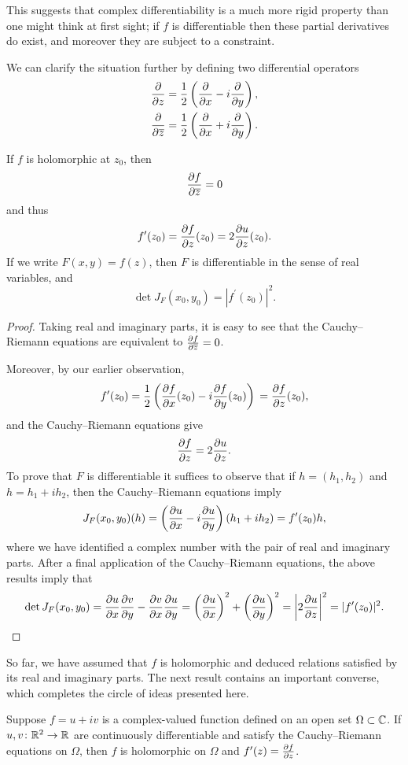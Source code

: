 \begin{remark}
This suggests that complex differentiability is a much more rigid property than one might think at first sight; if $f$ is differentiable then these partial derivatives do exist, and moreover they are subject to a constraint.
\end{remark}

We can clarify the situation further by defining two differential operators
\begin{align*}
\pdv{}{z}&=\frac{1}{2}\left(\pdv{}{x}-i\pdv{}{y}\right),\\
\pdv{}{\overline{z}}&=\frac{1}{2}\left(\pdv{}{x}+i\pdv{}{y}\right).
\end{align*}

\begin{proposition}
If $f$ is holomorphic at $z_0$, then
\[\pdv{f}{\overline{z}}=0\]
and thus
\[f^\prime(z_0)=\pdv{f}{z}(z_0)=2\pdv{u}{z}(z_0).\]
If we write $F(x,y)=f(z)$, then $F$ is differentiable in the sense of real variables, and
\[\det J_F(x_0,y_0)=|f^\prime(z_0)|^2.\]
\end{proposition}

\begin{proof}
Taking real and imaginary parts, it is easy to see that the Cauchy--Riemann equations are equivalent to $\pdv{f}{\overline{z}}=0$.

Moreover, by our earlier observation,
\[f^\prime(z_0)
=\frac{1}{2}\left(\pdv{f}{x}(z_0)-i\pdv{f}{y}(z_0)\right)\\
=\pdv{f}{z}(z_0),\]
and the Cauchy--Riemann equations give
\[\pdv{f}{z}=2\pdv{u}{z}.\]
To prove that $F$ is differentiable it suffices to observe that if $h=(h_1,h_2)$ and $h=h_1+ih_2$, then the Cauchy--Riemann equations imply
\[J_F(x_0,y_0)(h)=\left(\pdv{u}{x}-i\pdv{u}{y}\right)(h_1+ih_2)=f^\prime(z_0)h,\]
where we have identified a complex number with the pair of real and imaginary parts. 
After a final application of the Cauchy--Riemann equations, the above results imply that
\[\det J_F(x_0,y_0)
=\pdv{u}{x}\pdv{v}{y}-\pdv{v}{x}\pdv{u}{y}
=\left(\pdv{u}{x}\right)^2+\left(\pdv{u}{y}\right)^2=\left|2\pdv{u}{z}\right|^2=|f^\prime(z_0)|^2.\]
\end{proof}

So far, we have assumed that $f$ is holomorphic and deduced relations satisfied by its real and imaginary parts. The next result contains an important converse, which completes the circle of ideas presented here.

\begin{proposition}
Suppose $f=u+iv$ is a complex-valued function defined on an open set $\Omega\subset\mathbb C$. If $u,v\colon\mathbb R^2\to\mathbb R$ are continuously differentiable and satisfy the Cauchy--Riemann equations on $\Omega$, then $f$ is holomorphic on $\Omega$ and $f^\prime(z)=\pdv{f}{z}$.
\end{proposition}

